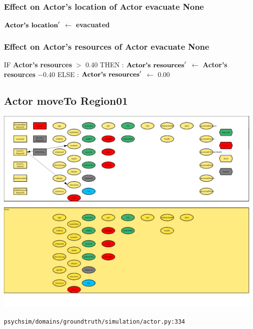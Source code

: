 \documentclass{article}%
\begin{document}
%
\subsubsection{Effect on Actor's location of Actor evacuate None}%
\label{ssubsec:Effect on Actor's location of Actor evacuate None}%
\begin{flushleft}%
$\mbox{\textbf{Actor's location}} '$%
$\leftarrow$%
\textbf{evacuated}%
\end{flushleft}

%
\subsubsection{Effect on Actor's resources of Actor evacuate None}%
\label{ssubsec:Effect on Actor's resources of Actor evacuate None}%
\begin{flushleft}%
IF %
\textbf{Actor's resources}%
$>$%
0.40%
\linebreak%
\hspace*{2em}%
THEN %
: %
$\mbox{\textbf{Actor's resources}} '$%
$\leftarrow$%
\textbf{Actor's resources}%
${-}0.40$%
\linebreak%
\hspace*{2em}%
ELSE %
: %
$\mbox{\textbf{Actor's resources}} '$%
$\leftarrow$%
0.00%
\end{flushleft}

%
\subsection{Actor moveTo Region01}%
\label{subsec:Actor moveTo Region01}%
\includegraphics[width=\textwidth]{images/Actor-moveTo-Region01.png}%
\begin{flushleft}%
\verb|psychsim/domains/groundtruth/simulation/actor.py:334|%
\end{flushleft}%
\end{document}
